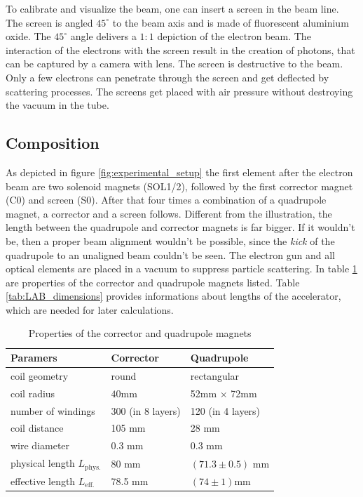 \documentclass[11pt,a4paper,notitlepage]{scrartcl}
\begin{document}
To calibrate and visualize the beam, one can insert a screen in the beam line. The screen is angled $45^\circ$ to the beam axis and is made of fluorescent aluminium oxide. The $45^\circ$ angle delivers a $1:1$ depiction of the electron beam. The interaction of the electrons with the screen result in the creation of photons, that can be captured by a camera with lens. The screen is destructive to the beam. Only a few electrons can penetrate through the screen and get deflected by scattering processes. The screens get placed with air pressure without destroying the vacuum in the tube. 
\subsection{Composition}
As depicted in figure \ref{fig:experimental_setup} the first element after the electron beam are two solenoid magnets (SOL1/2), followed by the first corrector magnet (C0) and screen (S0). After that four times a combination of a quadrupole magnet, a corrector and a screen follows. Different from the illustration, the length between the quadrupole and corrector magnets is far bigger. If it wouldn't be, then a proper beam alignment wouldn't be possible, since the \emph{kick} of the quadrupole to an unaligned beam couldn't be seen. The electron gun and all optical elements are placed in a vacuum to suppress particle scattering. In table \ref{tab:LAB_properties} are properties of the corrector and quadrupole magnets listed. Table \ref{tab:LAB_dimensions} provides informations about lengths of the accelerator, which are needed for later calculations.
\begin{table}[]
	\centering
	\begin{tabular}{|l|l|l|}
		\hline
		Paramers                         & Corrector         & Quadrupole         \\
		\hline
		coil geometry                    & round             & rectangular        \\
		coil radius                      & $40$mm            & 52mm $\times$ 72mm \\
		number of windings               & 300 (in 8 layers) & 120 (in 4 layers)  \\
		coil distance                    & 105 mm            & 28 mm              \\
		wire diameter                    & 0.3 mm            & 0.3 mm             \\
		physical length $L_\text{phys.}$ & 80 mm             & $(71.3\pm0.5)$ mm  \\
		effective length $L_\text{eff.}$ & 78.5 mm           & $(74\pm1)$mm      \\
		\hline
	\end{tabular}
	\caption{Properties of the corrector and quadrupole magnets \cite{script}}\label{tab:LAB_properties}
\end{table}
\end{document}

